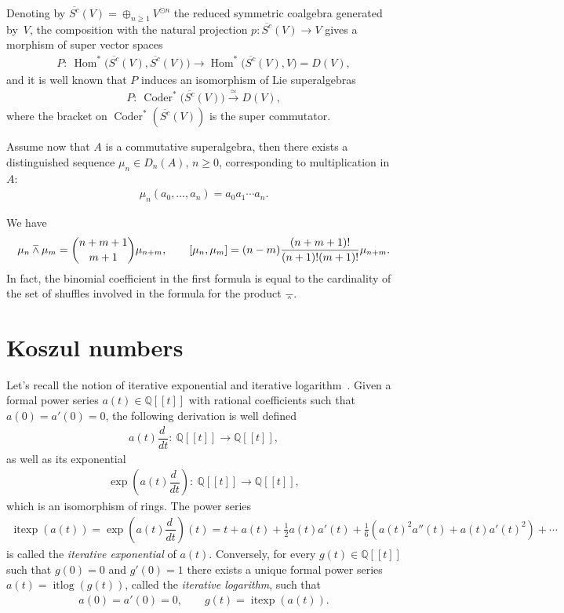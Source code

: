 \documentclass[pdftex]{sigma}
\newcommand{\wedgebar}{\barwedge}
\newcommand{\Hom}{\operatorname{Hom}}
\newcommand{\Coder}{\operatorname{Coder}}
\newcommand{\Q}{\mathbb{Q}}
\numberwithin{equation}{section}
\begin{document}
\begin{Remark}\label{rem.coderivationNR}
Denoting by $\overline{S^c}(V)=\oplus_{n\ge 1} V^{\odot n}$ the reduced symmetric coalgebra generated by~$V$,
the composition with the natural projection $p\colon \overline{S^c}(V)\to V$ gives a morphism of super vector spaces
\begin{gather*} P\colon \ \Hom^*\big(\overline{S^c}(V),\overline{S^c}(V)\big)\to \Hom^*\big(\overline{S^c}(V),V\big)=D(V),\end{gather*}
and it is well known \cite{LadaMarkl} that $P$ induces an isomorphism of Lie superalgebras
\begin{gather*} P\colon \ \Coder^*\big(\overline{S^c}(V)\big)\xrightarrow{\simeq} D(V),\end{gather*}
where the bracket on $\Coder^*(\overline{S^c}(V))$ is the super commutator.
\end{Remark}

Assume now that $A$ is a commutative superalgebra, then there exists a distinguished sequence $\mu_n\in D_n(A)$, $n\ge 0$, corresponding to multiplication in~$A$:
\begin{gather*} \mu_n(a_0,\ldots,a_n)=a_0a_1\cdots a_n .\end{gather*}

We have
\begin{gather}\label{equ.bracketmuenne}
\mu_n\wedgebar \mu_m=\dbinom{n+m+1}{m+1}\mu_{n+m},\qquad
[\mu_n,\mu_m]=(n-m)\dfrac{(n+m+1)!}{(n+1)!(m+1)!}
\mu_{n+m} .\end{gather}
In fact, the binomial coef\/f\/icient in the f\/irst formula is equal to the cardinality of the set of shuf\/f\/les involved in the formula for the product $\wedgebar$.

\section{Koszul numbers}

Let's recall the notion of iterative exponential and iterative logarithm~\cite{ecalle}. Given a formal power series $a(t)\in\Q[[t]]$ with rational coef\/f\/icients such that $a(0)=a'(0)=0$, the following derivation is well def\/ined
\begin{gather*}a(t)\dfrac{d~}{dt}\colon \ \Q[[t]]\to \Q[[t]] ,\end{gather*}
as well as its exponential
\begin{gather*} \exp\left(a(t)\dfrac{d~}{dt}\right)\colon\ \Q[[t]]\to \Q[[t]] ,\end{gather*}
which is an isomorphism of rings. The power series
\begin{gather*}
\operatorname{itexp}(a(t))=\exp\left(a(t)\dfrac{d~}{dt}\right)(t)=t+a(t)+\frac{1}{2}a(t)a'(t)
+\frac{1}{6}(a(t)^2a''(t)+a(t)a'(t)^2)+\cdots
\end{gather*}
is called the \emph{iterative exponential} of $a(t)$. Conversely, for every $g(t)\in \Q[[t]]$ such that $g(0)=0$ and $g'(0)=1$ there exists a unique formal power series $a(t)=\operatorname{itlog}(g(t))$, called the \emph{iterative logarithm}, such that
\begin{gather*}%
a(0)=a'(0)=0,\qquad g(t)=\operatorname{itexp}(a(t)) .
\end{gather*}
\end{document}
